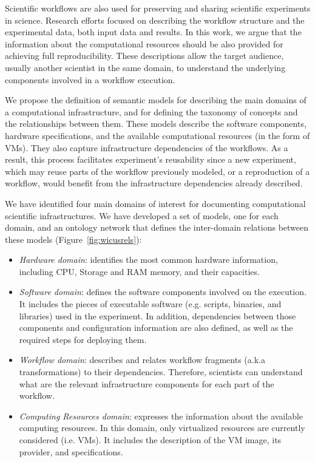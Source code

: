 
Scientific workflows are also used for preserving and sharing scientific experiments in science. Research efforts focused on describing the workflow structure and the experimental data, both input data and results.
In this work, we argue that the information about the computational resources should be also provided for achieving full reproducibility. 
These descriptions  allow the target audience, usually another scientist in the same domain, to understand the underlying components involved in a workflow execution.

We propose the definition of semantic models for describing the main domains of a computational infrastructure, and for defining the taxonomy of concepts and the relationships between them. These models describe the software components, hardware specifications, and the available computational resources (in the form of VMs). They also capture infrastructure dependencies of the workflows. As a result, this process facilitates experiment's reusability since a new experiment, which may reuse parts of the workflow previously modeled, or a reproduction of a workflow, would benefit from the infrastructure dependencies already described.

We have identified four main domains of interest for documenting computational scientific infrastructures. We have developed a set of models, one for each domain, and an ontology network that defines the inter-domain relations between these models (Figure~\ref{fig:wicusrels}):

\begin{itemize}
	\setlength{\itemsep}{1pt}
    \setlength{\parskip}{0pt}
    \setlength{\parsep}{0pt}

	\item{\emph{Hardware domain}}: identifies the most common hardware information, including CPU, Storage and RAM memory, and their capacities.
	
    \item{\emph{Software domain}}: defines the software components involved on the execution. It includes the pieces of executable software (e.g. scripts, binaries, and libraries) used in the experiment. In addition, dependencies between those components and configuration information are also defined, as well as the required steps for deploying them.
	
    \item{\emph{Workflow domain}}: describes and relates workflow fragments (a.k.a transformations) to their dependencies. Therefore, scientists can understand what are the relevant infrastructure components for each part of the workflow.
	
    \item{\emph{Computing Resources domain}}: expresses the information about the available computing resources. In this domain, only virtualized resources are currently considered (i.e. VMs). It includes the description of the VM image, its provider, and specifications.
\end{itemize}

